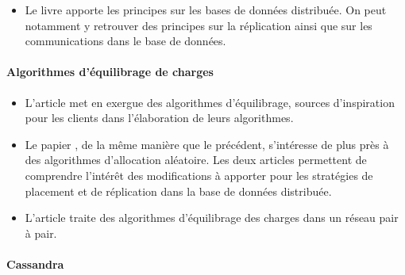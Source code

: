 \documentclass[12pt]{article}
\begin{document}
\begin{itemize}
\item Le livre \cite{Ozsu2011} apporte les principes sur les bases de données distribuée. On peut notamment y retrouver des principes sur la réplication ainsi que sur les communications dans le base de données.

\end{itemize}

\paragraph{Algorithmes d'équilibrage de charges}

\begin{itemize}
\item L'article \cite{BalancedAlloc99} met en exergue des algorithmes d'équilibrage, sources d'inspiration pour les clients dans l'élaboration de leurs algorithmes.

\item Le papier \cite{RandomChoices05}, de la même manière que le précédent, s'intéresse de plus près à des algorithmes d'allocation aléatoire. Les deux articles permettent de comprendre l'intérêt des modifications à apporter pour les stratégies de placement et de réplication dans la base de données distribuée.

\item L'article \cite{LoadBalancingPeertoPeer14} traite des algorithmes d'équilibrage des charges dans un réseau pair à pair.

\end{itemize}

\paragraph{Cassandra}
\end{document}
